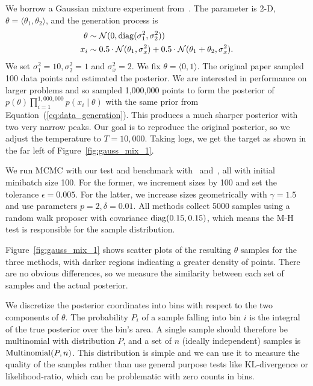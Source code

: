 \documentclass[twoside]{article} \usepackage{aistats2017}
\begin{document}
We borrow a Gaussian mixture experiment from~\citet{langevin_2011}.  The
parameter is 2-D, $\theta = \langle \theta_1,\theta_2 \rangle$, and the
generation process is
\begin{equation}\label{eq:data_generation}
\begin{split}
    \theta &\sim \mathcal{N}(0, {\rm diag}(\sigma_1^2,\sigma_2^2)) \\
    x_i & \sim 0.5 \cdot \mathcal{N}(\theta_1, \sigma_x^2) + 0.5 \cdot \mathcal{N}(\theta_1+\theta_2, \sigma_x^2).
\end{split}
\end{equation}
We set $\sigma_1^2 = 10, \sigma_2^2 = 1$ and $\sigma_x^2=2$.  We fix $\theta =
\langle 0,1 \rangle$. The original paper sampled 100 data points and estimated
the posterior. We are interested in performance on larger problems and so
sampled 1,000,000 points to form the posterior of
$p(\theta)\prod_{i=1}^{1,000,000}p(x_i\mid \theta)$ with the same prior from
Equation~(\ref{eq:data_generation}). This produces a much sharper posterior with
two very narrow peaks.  Our goal is to reproduce the original posterior, so we
adjust the temperature to $T=10,000$.  Taking logs, we get the target as shown
in the far left of Figure~\ref{fig:gauss_mix_1}.

We run MCMC with our test and benchmark with~\citet{cutting_mh_2014}
and~\citet{icml2014c1_bardenet14}, all with initial minibatch size 100.  For the
former, we increment sizes by 100 and set the tolerance $\epsilon=0.005$.  For
the latter, we increase sizes geometrically with $\gamma = 1.5$ and use
parameters $p = 2, \delta = 0.01$.  All methods collect 5000 samples using a
random walk proposer with covariance ${\rm diag}(0.15, 0.15)$, which means the
M-H test is responsible for the sample distribution.

Figure~\ref{fig:gauss_mix_1} shows scatter plots of the resulting $\theta$
samples for the three methods, with darker regions indicating a greater density
of points. There are no obvious differences, so we measure the similarity
between each set of samples and the actual posterior. 

We discretize the posterior coordinates into bins with respect to the two
components of $\theta$.  The probability $P_i$ of a sample falling into bin $i$
is the integral of the true posterior over the bin's area.  A single sample
should therefore be multinomial with distribution $P$, and a set of $n$ (ideally
independent) samples is ${\rm Multinomial}(P,n)$. This distribution is simple
and we can use it to measure the quality of the samples rather than use general
purpose tests like KL-divergence or likelihood-ratio, which can be problematic
with zero counts in bins.
\end{document}
